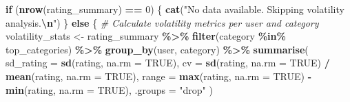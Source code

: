 \documentclass[
]{article}
\newenvironment{Shaded}{\begin{snugshade}}{\end{snugshade}}
\newcommand{\AttributeTok}[1]{\textcolor[rgb]{0.13,0.29,0.53}{#1}}
\newcommand{\CommentTok}[1]{\textcolor[rgb]{0.56,0.35,0.01}{\textit{#1}}}
\newcommand{\ConstantTok}[1]{\textcolor[rgb]{0.56,0.35,0.01}{#1}}
\newcommand{\ControlFlowTok}[1]{\textcolor[rgb]{0.13,0.29,0.53}{\textbf{#1}}}
\newcommand{\DecValTok}[1]{\textcolor[rgb]{0.00,0.00,0.81}{#1}}
\newcommand{\FunctionTok}[1]{\textcolor[rgb]{0.13,0.29,0.53}{\textbf{#1}}}
\newcommand{\NormalTok}[1]{#1}
\newcommand{\OtherTok}[1]{\textcolor[rgb]{0.56,0.35,0.01}{#1}}
\newcommand{\SpecialCharTok}[1]{\textcolor[rgb]{0.81,0.36,0.00}{\textbf{#1}}}
\newcommand{\StringTok}[1]{\textcolor[rgb]{0.31,0.60,0.02}{#1}}
\begin{document}
\begin{Shaded}
\begin{Highlighting}[]
\ControlFlowTok{if}\NormalTok{ (}\FunctionTok{nrow}\NormalTok{(rating\_summary) }\SpecialCharTok{==} \DecValTok{0}\NormalTok{) \{}
    \FunctionTok{cat}\NormalTok{(}\StringTok{"No data available. Skipping volatility analysis.}\SpecialCharTok{\textbackslash{}n}\StringTok{"}\NormalTok{)}
\NormalTok{\} }\ControlFlowTok{else}\NormalTok{ \{}
    \CommentTok{\# Calculate volatility metrics per user and category}
\NormalTok{    volatility\_stats }\OtherTok{\textless{}{-}}\NormalTok{ rating\_summary }\SpecialCharTok{\%\textgreater{}\%}
        \FunctionTok{filter}\NormalTok{(category }\SpecialCharTok{\%in\%}\NormalTok{ top\_categories) }\SpecialCharTok{\%\textgreater{}\%}
        \FunctionTok{group\_by}\NormalTok{(user, category) }\SpecialCharTok{\%\textgreater{}\%}
        \FunctionTok{summarise}\NormalTok{(}
            \AttributeTok{sd\_rating =} \FunctionTok{sd}\NormalTok{(rating, }\AttributeTok{na.rm =} \ConstantTok{TRUE}\NormalTok{),}
            \AttributeTok{cv =} \FunctionTok{sd}\NormalTok{(rating, }\AttributeTok{na.rm =} \ConstantTok{TRUE}\NormalTok{) }\SpecialCharTok{/} \FunctionTok{mean}\NormalTok{(rating, }\AttributeTok{na.rm =} \ConstantTok{TRUE}\NormalTok{),}
            \AttributeTok{range =} \FunctionTok{max}\NormalTok{(rating, }\AttributeTok{na.rm =} \ConstantTok{TRUE}\NormalTok{) }\SpecialCharTok{{-}} \FunctionTok{min}\NormalTok{(rating, }\AttributeTok{na.rm =} \ConstantTok{TRUE}\NormalTok{),}
            \AttributeTok{.groups =} \StringTok{"drop"}
\NormalTok{        )}


\end{Highlighting}
\end{Shaded}
\end{document}
